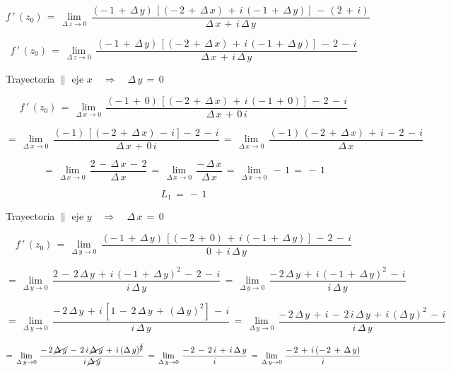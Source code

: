 \documentclass[a4paper,11pt,openany]{book}
\begin{document}
$$f\,'\,(z_{0})\,=\,\displaystyle\lim_{\Delta\,z \to 0}\,\dfrac{(-\,1\,+\,\Delta\,y)\,\left[(-\,2\,+\,\Delta\,x)\,+\,i\,(-\,1\,+\,\Delta\,y)\right]\,-\,(2\,+\,i)}{\Delta\,x\,+\,i\,\Delta\,y}$$

$$f\,'\,(z_{0})\,=\,\displaystyle\lim_{\Delta\,z \to 0}\,\dfrac{(-\,1\,+\,\Delta\,y)\,\left[(-\,2\,+\,\Delta\,x)\,+\,i\,(-\,1\,+\,\Delta\,y)\right]\,-\,2\,-\,i}{\Delta\,x\,+\,i\,\Delta\,y}$$

\newpage

\textcolor{ao(english)}{} Trayectoria $\parallel$ eje $x \quad\Rightarrow\quad \Delta\,y\,=\,0$

$$f\,'\,(z_{0})\,=\,\displaystyle\lim_{\Delta\,x \to 0}\,\dfrac{(-\,1\,+\,0)\,\left[(-\,2\,+\,\Delta\,x)\,+\,i\,(-\,1\,+\,0)\right]\,-\,2\,-\,i}{\Delta\,x\,+\,0\,i}$$

$$=\,\displaystyle\lim_{\Delta\,x \to 0}\,\dfrac{(-\,1)\,\left[(-\,2\,+\,\Delta\,x)\,-\,i\right]-\,2\,-\,i}{\Delta\,x\,+\,0\,i}\,=\,\displaystyle\lim_{\Delta\,x \to 0}\,\dfrac{(-\,1)\,(-\,2\,+\,\Delta\,x)\,+\,i\,-\,2\,-\,i}{\Delta\,x}$$

$$=\,\displaystyle\lim_{\Delta\,x \to 0}\,\dfrac{2\,-\,\Delta\,x\,-\,2}{\Delta\,x}\,=\,\displaystyle\lim_{\Delta\,x \to 0}\,\dfrac{-\,\Delta\,x}{\Delta\,x}\,=\,\displaystyle\lim_{\Delta\,x \to 0}\,-\,1\,=\,-\,1$$

$$L_{1}\,=\,-\,1$$

\textcolor{ao(english)}{} Trayectoria $\parallel$ eje $y \quad\Rightarrow\quad \Delta\,x\,=\,0$

$$f\,'\,(z_{0})\,=\,\displaystyle\lim_{\Delta\,y \to 0}\,\dfrac{(-\,1\,+\,\Delta\,y)\,\left[(-\,2\,+\,0)\,+\,i\,(-\,1\,+\,\Delta\,y)\right]\,-\,2\,-\,i}{0\,+\,i\,\Delta\,y}$$

$$=\,\displaystyle\lim_{\Delta\,y \to 0}\,\dfrac{2\,-\,2\,\Delta\,y\,+\,i\,(-\,1\,+\,\Delta\,y)^{2}\,-\,2\,-\,i}{i\,\Delta\,y}\,=\,\displaystyle\lim_{\Delta\,y \to 0}\,\dfrac{-\,2\,\Delta\,y\,+\,i\,(-\,1\,+\,\Delta\,y)^{2}\,-\,i}{i\,\Delta\,y}$$

$$=\,\displaystyle\lim_{\Delta\,y \to 0}\,\dfrac{-\,2\,\Delta\,y\,+\,i\,[1\,-\,2\,\Delta\,y\,+\,(\Delta\,y)^{2}]\,-\,i}{i\,\Delta\,y}\,=\,\displaystyle\lim_{\Delta\,y \to 0}\,\dfrac{-\,2\,\Delta\,y\,+\,i\,-\,2\,i\,\Delta\,y\,+\,i\,(\Delta\,y)^{2}\,-\,i}{i\,\Delta\,y}$$

$$=\,\displaystyle\lim_{\Delta\,y \to 0}\,\dfrac{-\,2\,\cancel{\Delta\,y}\,-\,2\,i\,\cancel{\Delta\,y}\,+\,i\,(\Delta\,y)^{\cancel{2}}}{i\,\cancel{\Delta\,y}}\,=\,\displaystyle\lim_{\Delta\,y \to 0}\,\dfrac{-\,2\,-\,2\,i\,+\,i\,\Delta\,y}{i}\,=\,\displaystyle\lim_{\Delta\,y \to 0}\,\dfrac{-\,2\,+\,i\,(-\,2\,+\,\Delta\,y)}{i}$$
\end{document}
